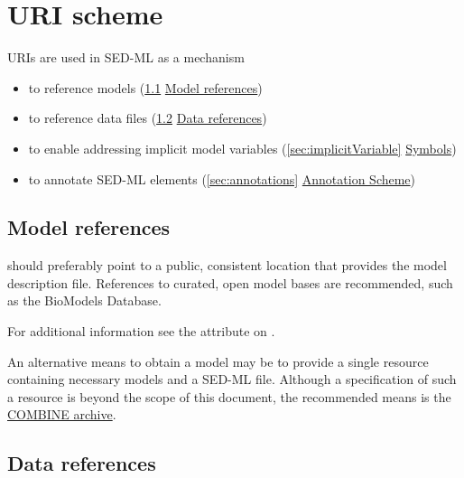 \section{URI scheme}  
\label{sec:uriScheme}
URIs are used in SED-ML as a mechanism
\begin{itemize}
	\item to reference models (\ref{sec:modelURI} \hyperref[sec:modelURI]{Model references})
	\item to reference data files (\ref{sec:dataURI} \hyperref[sec:dataURI]{Data references})
	\item to enable addressing implicit model variables (\ref{sec:implicitVariable}  \hyperref[sec:implicitVariable]{Symbols})
	\item to annotate SED-ML elements (\ref{sec:annotations}  \hyperref[sec:annotations]{Annotation Scheme})
\end{itemize}

\subsection{Model references}
\label{sec:modelURI}
 should preferably point to a public, consistent location that provides the model description file. References to curated, open model bases are recommended, such as the BioModels Database. 

For additional information see the \hyperref[sec:model_source]{} attribute on \Model.

An alternative means to obtain a model may be to provide a single resource containing necessary models and a SED-ML file. Although a specification of such a resource is beyond the scope of this document, the recommended means is the \hyperref[sec:archive]{COMBINE archive}.


\subsection{Data references}
\label{sec:dataURI}


